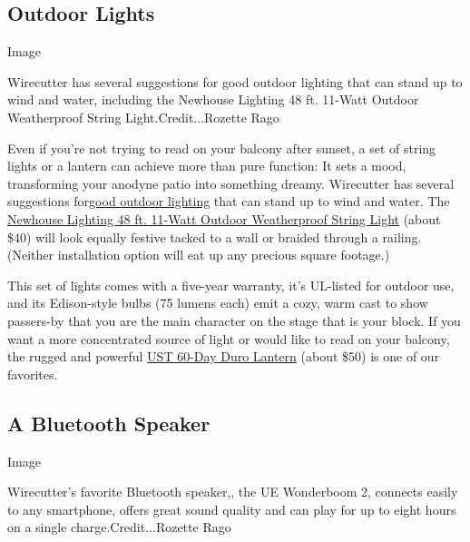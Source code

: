 \hypertarget{outdoor-lights}{%
\subsection{Outdoor Lights}\label{outdoor-lights}}

Image

Wirecutter has several suggestions for good outdoor lighting that can
stand up to wind and water, including the Newhouse Lighting 48 ft.
11-Watt Outdoor Weatherproof String Light.Credit...Rozette Rago

Even if you're not trying to read on your balcony after sunset, a set of
string lights or a lantern can achieve more than pure function: It sets
a mood, transforming your anodyne patio into something dreamy.
Wirecutter has several suggestions
for\href{https://www.nytimes.com/wirecutter/reviews/best-led-lantern/?utm_source=nytimes\&utm_medium=referral\&utm_campaign=outdoor-space}{good
outdoor lighting} that can stand up to wind and water. The
\href{https://www.nytimes.com/wirecutter/reviews/best-led-lantern/?utm_source=nytimes\&utm_medium=referral\&utm_campaign=outdoor-space\#string-light-newhouse-lighting-48-ft-11-watt-outdoor-weatherproof-string-light}{Newhouse
Lighting 48 ft. 11-Watt Outdoor Weatherproof String Light} (about \$40)
will look equally festive tacked to a wall or braided through a railing.
(Neither installation option will eat up any precious square footage.)

This set of lights comes with a five-year warranty, it's UL-listed for
outdoor use, and its Edison-style bulbs (75 lumens each) emit a cozy,
warm cast to show passers-by that you are the main character on the
stage that is your block. If you want a more concentrated source of
light or would like to read on your balcony, the rugged and powerful
\href{https://www.nytimes.com/wirecutter/reviews/best-led-lantern/?utm_source=nytimes\&utm_medium=referral\&utm_campaign=outdoor-space\#tabletop-lantern-ust-60-day-duro-lantern}{UST
60-Day Duro Lantern} (about \$50) is one of our favorites.

\hypertarget{a-bluetooth-speaker}{%
\subsection{A Bluetooth Speaker}\label{a-bluetooth-speaker}}

Image

Wirecutter's favorite Bluetooth speaker,, the UE Wonderboom 2, connects
easily to any smartphone, offers great sound quality and can play for up
to eight hours on a single charge.Credit...Rozette Rago

